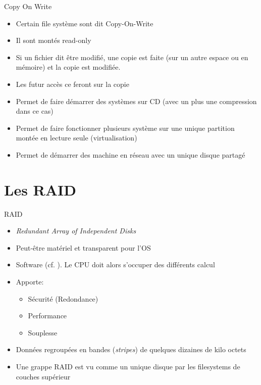 \begin{frame}[fragile=singleslide]{Copy On Write}
  \begin{itemize}
  \item Certain file système sont dit Copy-On-Write
  \item Il sont montés read-only
  \item Si  un fichier dit  être modifié, une  copie est faite  (sur un
    autre espace ou en mémoire) et la copie est modifiée.
  \item Les futur accès ce feront sur la copie
  \item Permet de faire démarrer des  systèmes sur CD (avec un plus une
    compression dans ce cas)
  \item Permet  de faire fonctionner plusieurs système  sur une unique
    partition montée en lecture seule (virtualisation)
  \item Permet de démarrer des  machine en réseau avec un unique disque
    partagé
  \end{itemize}
\end{frame}

\section{Les RAID}

\begin{frame}[fragile=singleslide]{RAID}
  \begin{itemize}
  \item \emph{Redundant Array of Independent Disks}
  \item Peut-être matériel et transparent pour l'OS
  \item Software (cf. ). Le CPU doit alors s'occuper des
    différents calcul
  \item Apporte:
    \begin{itemize}
    \item Sécurité (Redondance)
    \item Performance
    \item Souplesse
    \end{itemize}
  \item  Données  regroupées en  bandes  (\emph{stripes}) de  quelques
    dizaines de kilo octets
  \item  Une  grappe  RAID est  vu  comme  un  unique disque  par  les
    filesystems de couches supérieur
  \end{itemize}
\end{frame}


